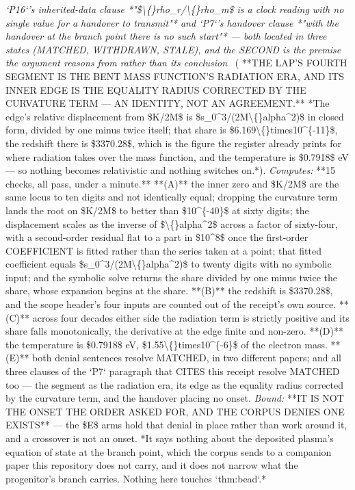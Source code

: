 \begin{description}
\textit{`P16`'s inherited-data clause *"\$\textbackslash\{\}rho\_r/\textbackslash\{\}rho\_m\$ is a clock reading with no single value for a handover to transmit"* and `P7`'s handover clause *"with the handover at the branch point there is no such start"* --- both located in three states (MATCHED, WITHDRAWN, STALE), and the SECOND is the premise the argument reasons from rather than its conclusion} \ ( **THE LAP'S FOURTH SEGMENT IS THE BENT MASS FUNCTION'S RADIATION ERA, AND ITS INNER EDGE IS THE EQUALITY RADIUS CORRECTED BY THE CURVATURE TERM --- AN IDENTITY, NOT AN AGREEMENT.** *The edge's relative displacement from \$K/2M\$ is \$s\_0\textasciicircum{}3/(2M\textbackslash\{\}alpha\textasciicircum{}2)\$ in closed form, divided by one minus twice itself; that share is \$6.169\textbackslash\{\}times10\textasciicircum{}\{-11\}\$, the redshift there is \$3370.28\$, which is the figure the register already prints for where radiation takes over the mass function, and the temperature is \$0.7918\$ eV --- so nothing becomes relativistic and nothing switches on.*). 
\emph{Computes:} **15 checks, all pass, under a minute.** **(A)** the inner zero and \$K/2M\$ are the same locus to ten digits and not identically equal; dropping the curvature term lands the root on \$K/2M\$ to better than \$10\textasciicircum{}\{-40\}\$ at sixty digits; the displacement scales as the inverse of \$\textbackslash\{\}alpha\textasciicircum{}2\$ across a factor of sixty-four, with a second-order residual flat to a part in \$10\textasciicircum{}8\$ once the first-order COEFFICIENT is fitted rather than the series taken at a point; that fitted coefficient equals \$s\_0\textasciicircum{}3/(2M\textbackslash\{\}alpha\textasciicircum{}2)\$ to twenty digits with no symbolic input; and the symbolic solve returns the share divided by one minus twice the share, whose expansion begins at the share. **(B)** the redshift is \$3370.28\$, and the scope header's four inputs are counted out of the receipt's own source. **(C)** across four decades either side the radiation term is strictly positive and its share falls monotonically, the derivative at the edge finite and non-zero. **(D)** the temperature is \$0.7918\$ eV, \$1.55\textbackslash\{\}times10\textasciicircum{}\{-6\}\$ of the electron mass. **(E)** both denial sentences resolve MATCHED, in two different papers; and all three clauses of the `P7` paragraph that CITES this receipt resolve MATCHED too --- the segment as the radiation era, its edge as the equality radius corrected by the curvature term, and the handover placing no onset.
 \emph{Bound:}  **IT IS NOT THE ONSET THE ORDER ASKED FOR, AND THE CORPUS DENIES ONE EXISTS** --- the \$E\$ arms hold that denial in place rather than work around it, and a crossover is not an onset. *It says nothing about the deposited plasma's equation of state at the branch point, which the corpus sends to a companion paper this repository does not carry, and it does not narrow what the progenitor's branch carries. Nothing here touches `thm:bead`.*

\end{description}
